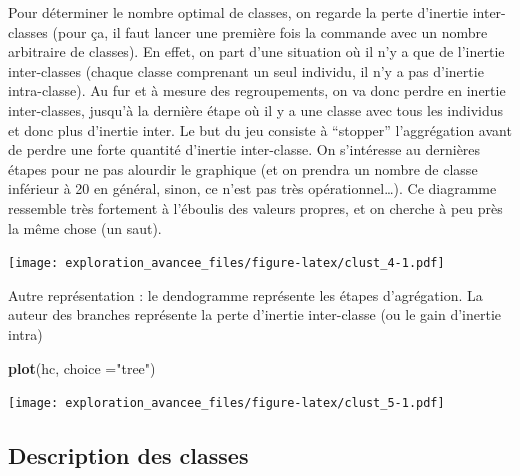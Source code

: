 \documentclass[]{book}
\newenvironment{Shaded}{\begin{snugshade}}{\end{snugshade}}
\newcommand{\DataTypeTok}[1]{\textcolor[rgb]{0.13,0.29,0.53}{#1}}
\newcommand{\DecValTok}[1]{\textcolor[rgb]{0.00,0.00,0.81}{#1}}
\newcommand{\KeywordTok}[1]{\textcolor[rgb]{0.13,0.29,0.53}{\textbf{#1}}}
\newcommand{\NormalTok}[1]{#1}
\newcommand{\OperatorTok}[1]{\textcolor[rgb]{0.81,0.36,0.00}{\textbf{#1}}}
\newcommand{\StringTok}[1]{\textcolor[rgb]{0.31,0.60,0.02}{#1}}
\begin{document}
Pour déterminer le nombre optimal de classes, on regarde la perte d'inertie inter-classes (pour ça, il faut lancer une première fois la commande avec un nombre arbitraire de classes). En effet, on part d'une situation où il n'y a que de l'inertie inter-classes (chaque classe comprenant un seul individu, il n'y a pas d'inertie intra-classe). Au fur et à mesure des regroupements, on va donc perdre en inertie inter-classes, jusqu'à la dernière étape où il y a une classe avec tous les individus et donc plus d'inertie inter. Le but du jeu consiste à ``stopper'' l'aggrégation avant de perdre une forte quantité d'inertie inter-classe. On s'intéresse au dernières étapes pour ne pas alourdir le graphique (et on prendra un nombre de classe inférieur à 20 en général, sinon, ce n'est pas très opérationnel\ldots{}). Ce diagramme ressemble très fortement à l'éboulis des valeurs propres, et on cherche à peu près la même chose (un saut).

\begin{Shaded}
\end{Shaded}

\texttt{[image: exploration\_avancee\_files/figure-latex/clust\_4-1.pdf]}

Autre représentation : le dendogramme représente les étapes d'agrégation. La auteur des branches représente la perte d'inertie inter-classe (ou le gain d'inertie intra)

\begin{Shaded}
\begin{Highlighting}[]
\KeywordTok{plot}\NormalTok{(hc, }\DataTypeTok{choice =}\StringTok{"tree"}\NormalTok{)}
\end{Highlighting}
\end{Shaded}

\texttt{[image: exploration\_avancee\_files/figure-latex/clust\_5-1.pdf]}

\hypertarget{description-des-classes}{%
\subsection{Description des classes}\label{description-des-classes}}
\end{document}

